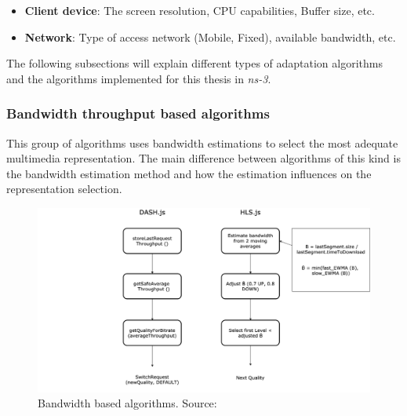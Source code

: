 \begin{itemize}[noitemsep,topsep=0pt]
  \item \textbf{Client device}: The screen resolution, CPU capabilities, Buffer size, etc.
  \item \textbf{Network}: Type of access network (Mobile, Fixed), available bandwidth, etc.
\end{itemize}

The following subsections will explain different types of adaptation algorithms and the algorithms implemented
for this thesis in \textit{ns-3}.

\subsubsection{Bandwidth throughput based algorithms}

This group of algorithms uses bandwidth estimations to select
the most adequate multimedia representation. The main difference between algorithms of
this kind is the bandwidth estimation method and how the estimation influences
on the representation selection. 

\begin{figure}[h]
  \centering
  \includegraphics[width=\textwidth]{img/dashjs.png}
  \caption{Bandwidth based algorithms. Source: \cite{abr1}}
  \label{fig:throughput}
\end{figure}

